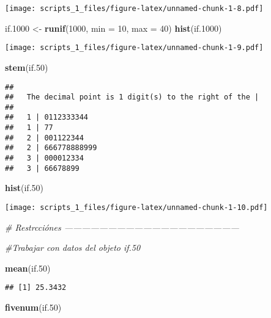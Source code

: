 \documentclass[
]{article}
\newenvironment{Shaded}{\begin{snugshade}}{\end{snugshade}}
\newcommand{\CommentTok}[1]{\textcolor[rgb]{0.56,0.35,0.01}{\textit{#1}}}
\newcommand{\DataTypeTok}[1]{\textcolor[rgb]{0.13,0.29,0.53}{#1}}
\newcommand{\DecValTok}[1]{\textcolor[rgb]{0.00,0.00,0.81}{#1}}
\newcommand{\FloatTok}[1]{\textcolor[rgb]{0.00,0.00,0.81}{#1}}
\newcommand{\KeywordTok}[1]{\textcolor[rgb]{0.13,0.29,0.53}{\textbf{#1}}}
\newcommand{\NormalTok}[1]{#1}
\newcommand{\StringTok}[1]{\textcolor[rgb]{0.31,0.60,0.02}{#1}}
\begin{document}
\texttt{[image: scripts\_1\_files/figure-latex/unnamed-chunk-1-8.pdf]}

\begin{Shaded}
\begin{Highlighting}[]
\NormalTok{if}\FloatTok{.1000}\NormalTok{ <-}\StringTok{ }\KeywordTok{runif}\NormalTok{(}\DecValTok{1000}\NormalTok{, }\DataTypeTok{min =} \DecValTok{10}\NormalTok{, }\DataTypeTok{max =} \DecValTok{40}\NormalTok{)}
\KeywordTok{hist}\NormalTok{(if}\FloatTok{.1000}\NormalTok{)}
\end{Highlighting}
\end{Shaded}

\texttt{[image: scripts\_1\_files/figure-latex/unnamed-chunk-1-9.pdf]}

\begin{Shaded}
\begin{Highlighting}[]
\KeywordTok{stem}\NormalTok{(if}\FloatTok{.50}\NormalTok{)}
\end{Highlighting}
\end{Shaded}

\begin{verbatim}
## 
##   The decimal point is 1 digit(s) to the right of the |
## 
##   1 | 0112333344
##   1 | 77
##   2 | 001122344
##   2 | 666778888999
##   3 | 000012334
##   3 | 66678899
\end{verbatim}

\begin{Shaded}
\begin{Highlighting}[]
\KeywordTok{hist}\NormalTok{(if}\FloatTok{.50}\NormalTok{)}
\end{Highlighting}
\end{Shaded}

\texttt{[image: scripts\_1\_files/figure-latex/unnamed-chunk-1-10.pdf]}

\begin{Shaded}
\begin{Highlighting}[]
\CommentTok{# Restrcciónes ------------------------------------------------------------}

\CommentTok{#Trabajar con datos del objeto if.50}

\KeywordTok{mean}\NormalTok{(if}\FloatTok{.50}\NormalTok{)}
\end{Highlighting}
\end{Shaded}

\begin{verbatim}
## [1] 25.3432
\end{verbatim}

\begin{Shaded}
\begin{Highlighting}[]
\KeywordTok{fivenum}\NormalTok{(if}\FloatTok{.50}\NormalTok{)}
\end{Highlighting}
\end{Shaded}
\end{document}

